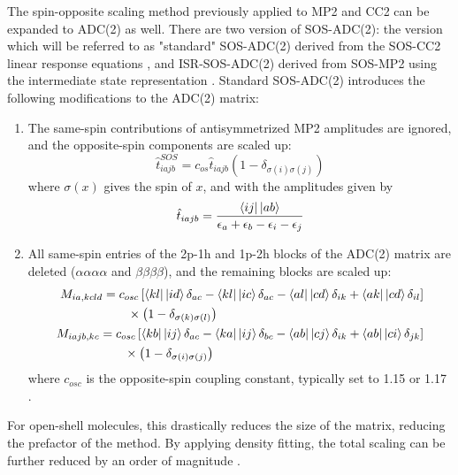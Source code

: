 The spin-opposite scaling method previously applied to MP2 and CC2 can be expanded to ADC(2) as well.    There are two version of SOS-ADC(2): the version which will be referred to as "standard" SOS-ADC(2) derived from the SOS-CC2 linear response equations \cite{Win2011}, and ISR-SOS-ADC(2) derived from SOS-MP2 using the intermediate state representation \cite{Kra2013}. Standard SOS-ADC(2) introduces the following modifications to the ADC(2) matrix:
\begin{enumerate}
\item The same-spin contributions of antisymmetrized MP2 amplitudes are ignored, and the opposite-spin components are scaled up:
\begin{equation}
\hat{t}_{iajb}^{SOS} = c_{os} \hat{t}_{iajb} \left( 1 - \delta _{\sigma (i) \sigma (j)} \right)
\label{eq:SOSAMPLITUDES}
\end{equation}
where $\sigma (x)$ gives the spin of $x$, and with the amplitudes given by
\begin{equation}
\hat{t}_{iajb} = \frac{\bra{ij}{}\ket{ab}}{\epsilon_a + \epsilon_b - \epsilon_i - \epsilon_j}
\end{equation}
\item All same-spin entries of the 2p-1h and 1p-2h blocks of the ADC(2) matrix are deleted ($\alpha\alpha\alpha\alpha$ and $\beta\beta\beta\beta$), and the  remaining blocks are scaled up:
\begin{align}
\begin{split}
M_{ia,kcld} &= c_{osc} \left[ \sbra{kl}{}\sket{id} \gd_{ac} - \sbra{kl}{}\sket{ic} \delta_{ac} - \sbra{al}{}\sket{cd} \delta_{ik} + \sbra{ak}{}\sket{cd} \delta_{il} \right] \\ & \qquad \times \left( 1 - \delta_{\sigma (k) \sigma (l)} \right)
\end{split}
\\
\begin{split}
M_{iajb,kc} &= c_{osc} \left[ \sbra{kb}\sket{ij} \gd_{ac} - \bra{ka}\sket{ij} \gd_{bc} - \sbra{ab}\sket{cj} \gd_{ik} + \sbra{ab}\sket{ci} \gd_{jk} \right] \\ 
& \qquad \times \left( 1 - \gd_{\gs (i) \gs (j)} \right)
\end{split}
\end{align}
\noindent where $c_{osc}$ is the opposite-spin coupling constant, typically set to 1.15 or 1.17 \cite{Kra2013}.
\end{enumerate}

\noindent For open-shell molecules, this drastically reduces the size of the matrix, reducing the prefactor of the method. By applying density fitting, the total scaling can be further reduced by an order of magnitude \cite{Win2011}.


